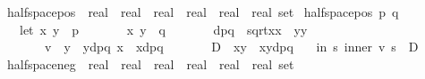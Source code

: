 \begin{isabellebody}
\endisadelimproof
\isanewline
\isanewline
\isanewline
{}\isamarkupfalse%
\ halfspace{\isacharunderscore}{\kern0pt}pos\ {\isacharcolon}{\kern0pt}{\isacharcolon}{\kern0pt}\ {\isachardoublequoteopen}real\ {\isasymtimes}\ real\ {\isasymRightarrow}\ real\ {\isasymtimes}\ real\ {\isasymRightarrow}\ {\isacharparenleft}{\kern0pt}real\ {\isasymtimes}\ real{\isacharparenright}{\kern0pt}\ set{\isachardoublequoteclose}\ \isanewline
{\isachardoublequoteopen}halfspace{\isacharunderscore}{\kern0pt}pos\ p\ q\ {\isasymequiv}\ \isanewline
\ \ \ let\ {\isacharparenleft}{\kern0pt}x{}{\isacharcomma}{\kern0pt}\ y{}{\isacharparenright}{\kern0pt}\ {\isacharequal}{\kern0pt}\ p{\isacharsemicolon}{\kern0pt}\isanewline
\ \ \ \ \ \ \ {\isacharparenleft}{\kern0pt}x{}{\isacharcomma}{\kern0pt}\ y{}{\isacharparenright}{\kern0pt}\ {\isacharequal}{\kern0pt}\ q{\isacharsemicolon}{\kern0pt}\isanewline
\ \ \ \ \ \ \ dpq\ {\isacharequal}{\kern0pt}\ sqrt{\isacharparenleft}{\kern0pt}{\isacharparenleft}{\kern0pt}x{}{\isacharminus}{\kern0pt}x{}{\isacharparenright}{\kern0pt}{\isacharcircum}{\kern0pt}{}\ {\isacharplus}{\kern0pt}\ {\isacharparenleft}{\kern0pt}y{}{\isacharminus}{\kern0pt}y{}{\isacharparenright}{\kern0pt}{\isacharcircum}{\kern0pt}{}{\isacharparenright}{\kern0pt}{\isacharsemicolon}{\kern0pt}\isanewline
\ \ \ \ \ \ \ v\ {\isacharequal}{\kern0pt}\ {\isacharparenleft}{\kern0pt}{\isacharparenleft}{\kern0pt}y{}\ {\isacharminus}{\kern0pt}\ y{}{\isacharparenright}{\kern0pt}{\isacharslash}{\kern0pt}dpq{\isacharcomma}{\kern0pt}\ {\isacharparenleft}{\kern0pt}x{}\ {\isacharminus}{\kern0pt}\ x{}{\isacharparenright}{\kern0pt}{\isacharslash}{\kern0pt}dpq{\isacharparenright}{\kern0pt}{\isacharsemicolon}{\kern0pt}\isanewline
\ \ \ \ \ \ \ D\ {\isacharequal}{\kern0pt}\ {\isacharparenleft}{\kern0pt}x{}{\isacharasterisk}{\kern0pt}y{}\ {\isacharminus}{\kern0pt}\ x{}{\isacharasterisk}{\kern0pt}y{}{\isacharparenright}{\kern0pt}{\isacharslash}{\kern0pt}dpq\isanewline
\ \ \ in\ {\isacharbraceleft}{\kern0pt}s{\isachardot}{\kern0pt}\ inner\ v\ s\ {\isasymge}\ D{\isacharbraceright}{\kern0pt}{\isachardoublequoteclose}\isanewline
\isanewline
{}\isamarkupfalse%
\ halfspace{\isacharunderscore}{\kern0pt}neg\ {\isacharcolon}{\kern0pt}{\isacharcolon}{\kern0pt}\ {\isachardoublequoteopen}real\ {\isasymtimes}\ real\ {\isasymRightarrow}\ real\ {\isasymtimes}\ real\ {\isasymRightarrow}\ {\isacharparenleft}{\kern0pt}real\ {\isasymtimes}\ real{\isacharparenright}{\kern0pt}\ set{\isachardoublequoteclose}\ \isanewline

\end{isabellebody}
